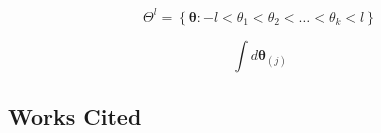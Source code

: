 \documentclass[Proceedings]{ascelike}
\begin{document}
\[
\Theta^l = \left\{ \boldsymbol{\theta} : -l < \theta_1 <\theta_2 < \ldots < \theta_k < l \right\}
\]



\[
\int d\boldsymbol{\theta}_{(j)}
\]





\subsection*{Works Cited}\label{section:references}
%
%

%
%
%
\end{document}
